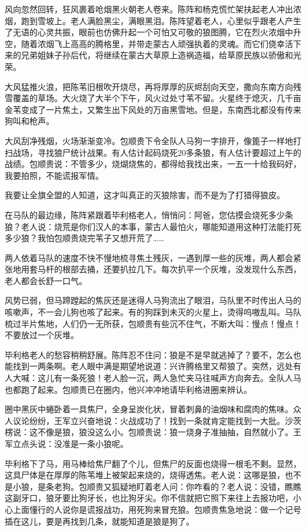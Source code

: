 \par 风向忽然回转，狂风裹着呛烟黑火朝老人卷来。陈阵和杨克慌忙架扶起老人冲出浓烟，跑到雪坡上。老人满脸黑尘，满眼黑泪。陈阵望着老人，心里似乎跟老人产生了无语的心灵共振，眼前也仿佛升起一个可怕又可敬的狼图腾，它在烈火浓烟中升空，随着浓烟飞上高高的腾格里，并带走蒙古人顽强执着的灵魂。而它们侥幸活下来的兄弟姐妹子孙后代，将继续在蒙古大草原上造祸造福，给草原民族以骄傲和光荣。
\par 大风猛推火浪，把陈苇旧根吹开烧尽，再将厚厚的灰烬刮向天空，撒向东南方向残雪覆盖的草场。大火烧了大半个下午，风火过处寸苇不留。火星终于熄灭，几千亩金苇变成了一片焦土，又繁生出下风处的万亩黑雪地。但是，东南西北都没有传来狗叫和枪声。
\par 大风刮净残烟，火场渐渐变冷。包顺贵下令全队人马狗一字排开，像篦子一样地打扫战场，寻找狼尸统计战果。有人估计起码烧死20多条狼，有人估计要超过上午的战绩。包顺贵说：不管多少，烧煳烧焦的，都得给我找出来，一五一十给我码好，我要拍照，不能谎报军情。
\par 我要让全旗全盟的人知道，这才叫真正的灭狼除害，而不是为了打猎得狼皮。
\par 在马队的最边缘，陈阵紧跟着毕利格老人，悄悄问：阿爸，您估摸会烧死多少条狼？老人说：烧荒是你们汉人的本事，蒙古人最怕火，哪能知道用这种打法能打死多少狼？我怕包顺贵烧完苇子又想开荒了……
\par 两人依着马队的速度不快不慢地梳寻焦土残灰，一遇到厚一些的灰堆，两人都会紧张地用套马杆的根部去捅，还要扒拉几下。每次扒平一个灰堆，没发现什么东西，老人都会长舒一口气。
\par 风势已弱，但马蹄蹚起的焦灰还是迷得人马狗流出了眼泪，马队里不时传出人马的咳嗽声，不一会儿狗也咳了起来。有的狗踩到未灭的火星上，烫得呜嗷乱叫。马队梳过半片焦地，人们仍一无所获，包顺贵有些沉不住气，不断大叫：慢点！慢点！不要放过一个灰堆。
\par 毕利格老人的愁容稍稍舒展。陈阵忍不住问：狼是不是早就逃掉了？要不，怎么也能找到一两条啊。老人眼中满是期望地说道：兴许腾格里又帮狼了。突然，远处有人大喊：这儿有一条死狼！老人脸一沉，两人急忙夹马往喊声方向奔去。全队人马也都跑了起来。包顺贵已在圈内，他兴冲冲地请毕利格进圈来辨认。
\par 圈中黑灰中蜷卧着一具焦尸，全身呈炭化状，冒着刺鼻的油烟味和腐肉的焦味。众人议论纷纷，王军立兴奋地说：火战成功了！找到一条就肯定能找到一大批。沙茨楞说：这不像是狼，狼没这么小。包顺贵说：狼一烧身子准抽抽，自然就小了。王军立点头说：没准是一条小狼呢。
\par 毕利格下了马，用马棒给焦尸翻了个儿，但焦尸的反面也烧得一根毛不剩。显然，这具尸体是在厚厚的陈苇堆上被架起来烧的，烧得透焦。老人说：这哪是狼，也不是小狼，是条老狗。包顺贵又狐疑地盯着老人问：你咋看的？老人说：没错，瞧瞧这副牙口，狼牙要比狗牙长，也比狗牙尖。你不信就把它照下来往上去报功吧，小心上面懂行的人说你是谎报战功，用死狗来冒充狼。包顺贵焦急地说：做一个记号插在这儿，要是再找到几条，就能知道是狼是狗了。
